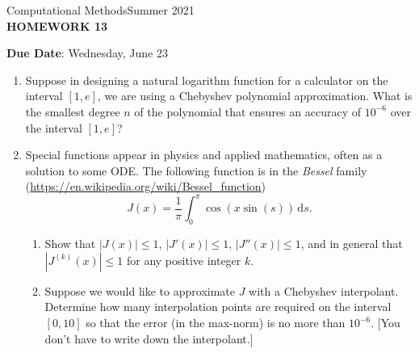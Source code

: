 \documentclass[12pt]{article}
\begin{document}
\begin{center}
Computational Methods\qquad Summer 2021
\\

\textbf{\large HOMEWORK 13}\\
\end{center}
\noindent \textbf{Due Date}: Wednesday, June 23\\

\begin{enumerate}
\item Suppose in designing a natural logarithm function for a calculator on the interval $[1,e]$, we are using a Chebyshev polynomial approximation. What is the smallest degree $n$ of the polynomial that ensures an accuracy of $10^{-6}$ over the interval $[1,e]$?
\item Special functions appear in physics and applied mathematics, often as a solution to some ODE. The following function is in the \emph{Bessel} family (\url{https://en.wikipedia.org/wiki/Bessel_function})
	\[J(x) = \frac{1}{\pi}\int_0^\pi\!\cos(x\sin(s))\,\mathrm{d}s.\]
	\begin{enumerate}
	\item Show that $|J(x)|\le 1$, $|J'(x)|\le 1$, $|J''(x)|\le 1$, and in general that $|J^{(k)}(x)|\le 1$ for any positive integer $k$.
	\item Suppose we would like to approximate $J$ with a Chebyshev interpolant. Determine how many interpolation points  are required on the interval $[0,10]$ so that the error (in the max-norm) is no more than $10^{-6}$. [You don't have to write down the interpolant.]
	\end{enumerate}
\end{enumerate}
\end{document}
